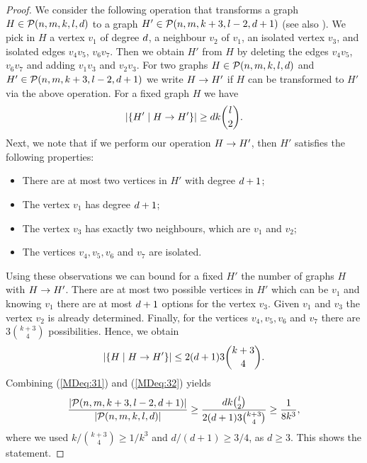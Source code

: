 \begin{proof}
We consider the following operation that transforms a graph $H\in \mathcal{P}(n,m,k,l,d)$ to a graph $H' \in \mathcal{P}(n,m,k+3,l-2,d+1)$ (see also ). We pick in $H$ a vertex $v_1$ of degree $d$, a neighbour $v_2$ of $v_1$, an isolated vertex $v_3$, and isolated edges $v_4v_5$, $v_6v_7$. Then we obtain $H'$ from $H$ by deleting the edges $v_4v_5$, $v_6v_7$ and adding $v_1v_3$ and $v_2v_3$. For two graphs $H\in \mathcal{P}(n,m,k,l,d)$ and $H' \in\mathcal{P}(n,m,k+3,l-2,d+1)$ we write $H\rightarrow H'$ if $H$ can be transformed to $H'$ via the above operation. For a fixed graph $H$ we have
\begin{align}\label{MDeq:31}
\left|\left\{H' \mid H\rightarrow H'\right\}\right|\geq dk\binom{l}{2}.
\end{align}
Next, we note that if we perform our operation $H\rightarrow H'$, then $H'$ satisfies the following properties:
\begin{itemize}
\item There are at most two vertices in $H'$ with degree $d+1$;
\item The vertex $v_1$ has degree $d+1$;
\item The vertex $v_3$ has exactly two neighbours, which are $v_1$ and $v_2$;
\item The vertices $v_4, v_5, v_6$ and $v_7$ are isolated.
\end{itemize}
Using these observations we can bound for a fixed $H'$ the number of graphs $H$ with $H\rightarrow H'$. There are at most two possible vertices in $H'$ which can be $v_1$ and knowing $v_1$ there are at most $d+1$ options for the vertex $v_3$. Given $v_1$ and $v_3$ the vertex $v_2$ is already determined. Finally, for the vertices $v_4, v_5, v_6$ and $v_7$ there are $3\binom{k+3}{4}$ possibilities. Hence, we obtain
\begin{align}\label{MDeq:32}
\left|\left\{H \mid H\rightarrow H'\right\}\right|\leq 2(d+1)3\binom{k+3}{4}.
\end{align}
Combining (\ref{MDeq:31}) and (\ref{MDeq:32}) yields
\begin{align*}
\frac{\left|\mathcal{P}(n,m,k+3,l-2,d+1)\right|}{\left|\mathcal{P}(n,m,k,l,d)\right|}\geq \frac{dk\binom{l}{2}}{2(d+1)3\binom{k+3}{4}}\geq \frac{1}{8k^3},
\end{align*}
where we used $k/\binom{k+3}{4}\geq 1/k^3$ and $d/(d+1)\geq 3/4$, as $d\geq 3$. This shows the statement.
\end{proof}
